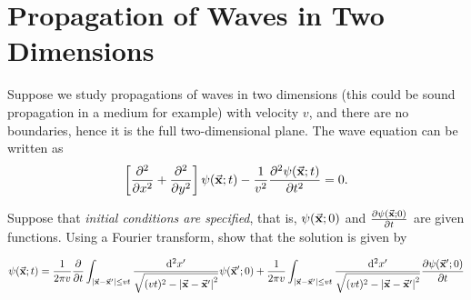 \documentclass[a4paper,twoside]{article}
\begin{document}
\section{Propagation of Waves in Two Dimensions}
Suppose we study propagations of waves in two dimensions (this could be sound propagation in a medium for example) with velocity $ v $, and there are no boundaries, hence it is the full two-dimensional plane. The wave equation can be written as
\begin{equation}
    \left[ \pdv[2]{x} + \pdv[2]{y} \right] \psi( \va{x};t) - \frac{1}{v^2} \pdv[2]{\psi( \va{x};t)}{t} = 0. 
\end{equation}

Suppose that \textit{initial conditions are specified}, that is, $ \psi( \va{x};0) $ and $ \pdv{\psi( \va{x};0)}{t} $ are given functions. Using a Fourier transform, show that the solution is given by

\begin{equation}
    \psi( \va{x};t) = \frac{1}{2 \pi v} \pdv{t} \int_{\abs{\va{x}-\va{x}'}\leq vt} \frac{\dd[2]{x'}}{\sqrt{(vt)^2 - \abs{\va{x}-\va{x}'}^2}} \psi( \va{x}';0) + \frac{1}{2 \pi v} \int_{\abs{\va{x}-\va{x}'}\leq vt} \frac{\dd[2]{x'}}{\sqrt{(vt)^2 - \abs{\va{x}-\va{x}'}^2}} \pdv{\psi( \va{x}';0)}{t}
\end{equation}
\end{document}
